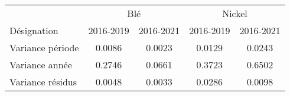 \begin{tabular}{@{}lcccc@{}}
    \toprule
    \multicolumn{1}{c}{} & \multicolumn{2}{c}{Blé}   & \multicolumn{2}{c}{Nickel} \\
    Désignation  & 2016-2019 & 2016-2021 & 2016-2019  & 2016-2021 \\ \cmidrule(r){1-1}\cmidrule(lr){2-3}\cmidrule(l){4-5}
    Variance période                         & 0.0086      & 0.0023      & 0.0129       & 0.0243      \\
    Variance année                           & 0.2746      & 0.0661      & 0.3723       & 0.6502      \\
    Variance résidus                         & 0.0048      & 0.0033      & 0.0286       & 0.0098      \\ \bottomrule
\end{tabular}